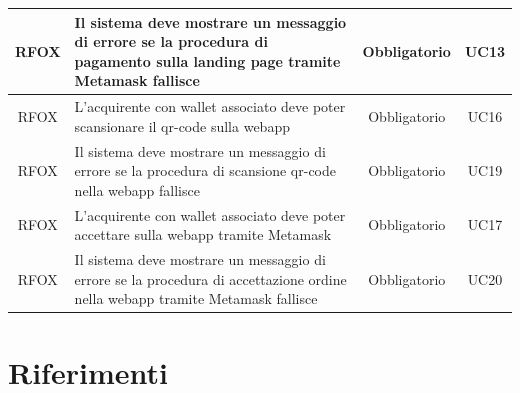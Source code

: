\documentclass[a4paper, 12pt]{article}
\begin{document}
\begin{longtable}{|c|p{5cm}|c|c|}
\hline
RFOX & Il sistema deve mostrare un messaggio di errore se la procedura di pagamento sulla landing page tramite Metamask fallisce & Obbligatorio & UC13 \\
\hline
RFOX & L'acquirente con wallet associato deve poter scansionare il qr-code sulla webapp & Obbligatorio & UC16 \\
\hline
RFOX & Il sistema deve mostrare un messaggio di errore se la procedura di scansione qr-code nella webapp fallisce & Obbligatorio & UC19 \\
\hline
RFOX & L'acquirente con wallet associato deve poter accettare sulla webapp tramite Metamask & Obbligatorio & UC17 \\
\hline
RFOX & Il sistema deve mostrare un messaggio di errore se la procedura di accettazione ordine nella webapp tramite Metamask fallisce & Obbligatorio & UC20 \\
\hline

\end{longtable}
 
\section{Riferimenti}
\end{document}
